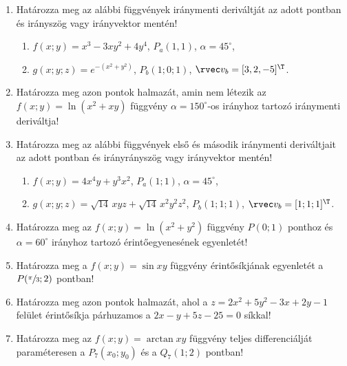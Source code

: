 \documentclass[a4paper, 12pt, fleqn]{scrartcl}
\begin{document}
\begin{enumerate}
  \item Határozza meg az alábbi függvények iránymenti deriváltját az adott
        pontban és irányszög vagy irányvektor mentén!
        \begin{enumerate}
          \item $f(x;y)=x^3-3xy^2+4y^4$,
                \tabto{7cm} $P_a(1,1)$,
                \tabto{10cm} $\alpha=45^{\circ}$,

          \item $g(x;y;z) = e^{-\left(x^2+y^2\right)}$,
                \tabto{7cm} $P_b(1;0;1)$,
                \tabto{10cm} $\rvec v_b=[3,2,-5]^\T$.
        \end{enumerate}

  \item Határozza meg azon pontok halmazát, amin nem létezik az
        $f(x;y)=\ln\left(x^2+xy\right)$ függvény $\alpha=150^\circ$-os irányhoz
        tartozó iránymenti deriváltja!

  \item Határozza meg az alábbi függvények első és második iránymenti
        deriváltjait az adott pontban és irányrányszög vagy irányvektor mentén!
        \begin{enumerate}
          \item $f(x;y)=4x^4y+y^3x^2$,
                \tabto{7cm} $P_a(1;1)$,
                \tabto{10cm} $\alpha=45^\circ$,

          \item $g(x;y;z)=\sqrt{14}\,xyz+\sqrt{14}\,x^2y^2z^2$,
                \tabto{7cm} $P_b(1;1;1)$,
                \tabto{10cm} $\rvec v_b=[1;1;1]^\T$.
        \end{enumerate}

  \item Határozza meg az $f(x; y)=\ln\left(x^2+y^2\right)$ függvény $P(0;1)$
        ponthoz és $\alpha=60^\circ$ irányhoz tartozó érintőegyenesének
        egyenletét!

  \item Határozza meg a $f(x; y)=\sin xy$ függvény érintősíkjának egyenletét a
        $P(\sfrac{\pi}{3};2)$ pontban!

  \item Határozza meg azon pontok halmazát, ahol a $z=2x^2+5y^2-3x+2y-1$ felület
        érintősíkja párhuzamos a $2x-y+5z-25=0$ síkkal!

  \item Határozza meg az $f(x;y)=\arctan xy$ függvény teljes differenciálját
        paraméteresen a $P_7(x_0; y_0)$ és a $Q_7(1; 2)$ pontban!


\end{enumerate}
\end{document}
